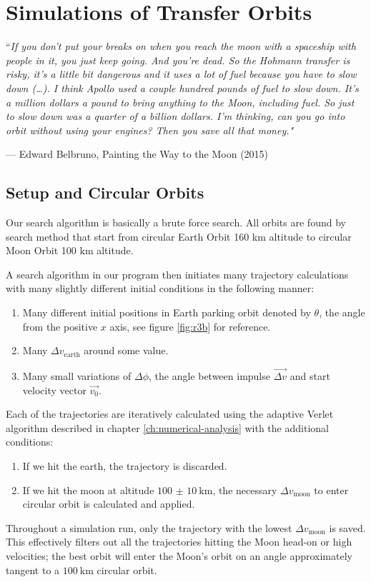 \chapter{Simulations of Transfer Orbits} \label{ch:simulations-of-transfer orbits}
\epigraph{``\itshape{If you don’t put your breaks on when you reach the moon with a spaceship with people in it, you just keep going. And you’re dead. So the Hohmann transfer is risky, it’s a little bit dangerous and it uses a lot of fuel because you have to slow down (…). I think Apollo used a couple hundred pounds of fuel to slow down. It’s a million dollars a pound to bring anything to the Moon, including fuel. So just to slow down was a quarter of a billion dollars. I’m thinking, can you go into orbit without using your engines? Then you save all that money.}"}{--- \textup{Edward Belbruno}, Painting the Way to the Moon (2015)}


\section{Setup and Circular Orbits}
Our search algorithm is basically a brute force search. All orbits are found by search method that start from circular Earth Orbit 160 km altitude to circular Moon Orbit 100 km altitude.

A search algorithm in our program then initiates many trajectory calculations with many slightly different initial conditions in the following manner:
\begin{enumerate}
    \item Many different initial positions in Earth parking orbit denoted by $\theta$, the angle from the positive $x$ axis, see figure \ref{fig:r3b} for reference. 
    \item Many $\Delta v_{\text{earth}}$ around some value.
    \item Many small variations of $\Delta \phi$, the angle between impulse $\vec{\Delta v}$ and start velocity vector $\vec{v_0}$.
\end{enumerate}

Each of the trajectories are iteratively calculated using the adaptive Verlet algorithm described in chapter \ref{ch:numerical-analysis} with the additional conditions:
\begin{enumerate}
    \item If we hit the earth, the trajectory is discarded.
    \item If we hit the moon at altitude $\SI[separate-uncertainty=true]{100(10)}{\km}$, the necessary $\Delta v_{\text{moon}}$ to enter circular orbit is calculated and applied.
\end{enumerate}
Throughout a simulation run, only the trajectory with the lowest $\Delta v_{\text{moon}}$ is saved. This effectively filters out all the trajectories hitting the Moon head-on or high velocities; the best orbit will enter the Moon's orbit on an angle approximately tangent to a $\SI{100}{\km}$ circular orbit.



